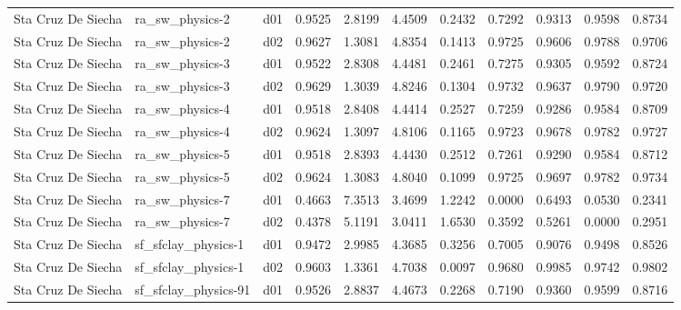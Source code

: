 \begin{longtable}{lllrrrrrrrr}
   Sta Cruz De Siecha  &       ra\_sw\_physics-2 &     d01 &   0.9525 &   2.8199 &   4.4509 &       0.2432 &        0.7292 &       0.9313 &           0.9598 &  0.8734 \\
   Sta Cruz De Siecha  &       ra\_sw\_physics-2 &     d02 &   0.9627 &   1.3081 &   4.8354 &       0.1413 &        0.9725 &       0.9606 &           0.9788 &  0.9706 \\
   Sta Cruz De Siecha  &       ra\_sw\_physics-3 &     d01 &   0.9522 &   2.8308 &   4.4481 &       0.2461 &        0.7275 &       0.9305 &           0.9592 &  0.8724 \\
   Sta Cruz De Siecha  &       ra\_sw\_physics-3 &     d02 &   0.9629 &   1.3039 &   4.8246 &       0.1304 &        0.9732 &       0.9637 &           0.9790 &  0.9720 \\
   Sta Cruz De Siecha  &       ra\_sw\_physics-4 &     d01 &   0.9518 &   2.8408 &   4.4414 &       0.2527 &        0.7259 &       0.9286 &           0.9584 &  0.8709 \\
   Sta Cruz De Siecha  &       ra\_sw\_physics-4 &     d02 &   0.9624 &   1.3097 &   4.8106 &       0.1165 &        0.9723 &       0.9678 &           0.9782 &  0.9727 \\
   Sta Cruz De Siecha  &       ra\_sw\_physics-5 &     d01 &   0.9518 &   2.8393 &   4.4430 &       0.2512 &        0.7261 &       0.9290 &           0.9584 &  0.8712 \\
   Sta Cruz De Siecha  &       ra\_sw\_physics-5 &     d02 &   0.9624 &   1.3083 &   4.8040 &       0.1099 &        0.9725 &       0.9697 &           0.9782 &  0.9734 \\
   Sta Cruz De Siecha  &       ra\_sw\_physics-7 &     d01 &   0.4663 &   7.3513 &   3.4699 &       1.2242 &        0.0000 &       0.6493 &           0.0530 &  0.2341 \\
   Sta Cruz De Siecha  &       ra\_sw\_physics-7 &     d02 &   0.4378 &   5.1191 &   3.0411 &       1.6530 &        0.3592 &       0.5261 &           0.0000 &  0.2951 \\
   Sta Cruz De Siecha  &   sf\_sfclay\_physics-1 &     d01 &   0.9472 &   2.9985 &   4.3685 &       0.3256 &        0.7005 &       0.9076 &           0.9498 &  0.8526 \\
   Sta Cruz De Siecha  &   sf\_sfclay\_physics-1 &     d02 &   0.9603 &   1.3361 &   4.7038 &       0.0097 &        0.9680 &       0.9985 &           0.9742 &  0.9802 \\
   Sta Cruz De Siecha  &  sf\_sfclay\_physics-91 &     d01 &   0.9526 &   2.8837 &   4.4673 &       0.2268 &        0.7190 &       0.9360 &           0.9599 &  0.8716 \\

\end{longtable}
